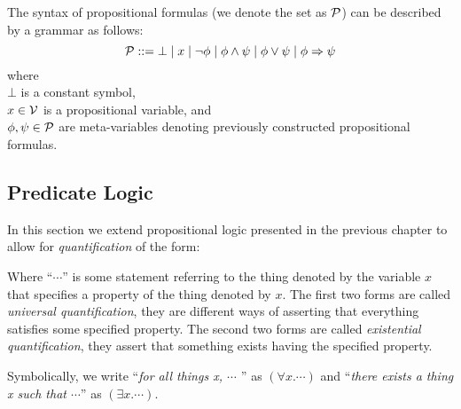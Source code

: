 \documentclass[11pt]{article}
\begin{document}
\begin{definition}
The syntax of propositional formulas (we denote the set as
${\cal{P}}$) can be described by a grammar as follows:
\[{\cal{P}}::= \bot \; | \; x \; | \; \neg\phi \; | \; \phi \wedge \psi \; | \; \phi \vee \psi \; | \; \phi \Rightarrow \psi \]
where\\
{\mbox{\hspace{.25in}}} $\bot$ is a constant symbol,\\
{\mbox{\hspace{.25in}}} $x\in{\cal{V}}$ is a propositional variable, and\\
{\mbox{\hspace{.25in}}} $\phi,\psi\in{\cal{P}}$ are meta-variables denoting previously constructed  propositional formulas.\\
\end{definition}


\subsection{Predicate Logic}

In this section we extend propositional logic presented in the previous chapter
to allow for {\em{quantification}} of the form:
\begin{quotation}
\goodbreak{} 
\goodbreak{} 
\goodbreak{}
\goodbreak{}
\end{quotation}
Where ``$\cdots$'' is some statement referring to the thing denoted by the
variable $x$ that specifies a property of the thing denoted by $x$.  The first
two forms are called {\em{universal quantification}}, they are different ways of
asserting that everything satisfies some specified property.  The second two
forms are called {\em{existential quantification}}, they assert that something
exists having the specified
property.

Symbolically, we write ``{\em{for all things x,
$\cdots$ }}'' as $(\forall x. \cdots)$ and ``{\em{there exists a thing x
such that $\cdots$}}'' as $(\exists x. \cdots)$.
\end{document}
